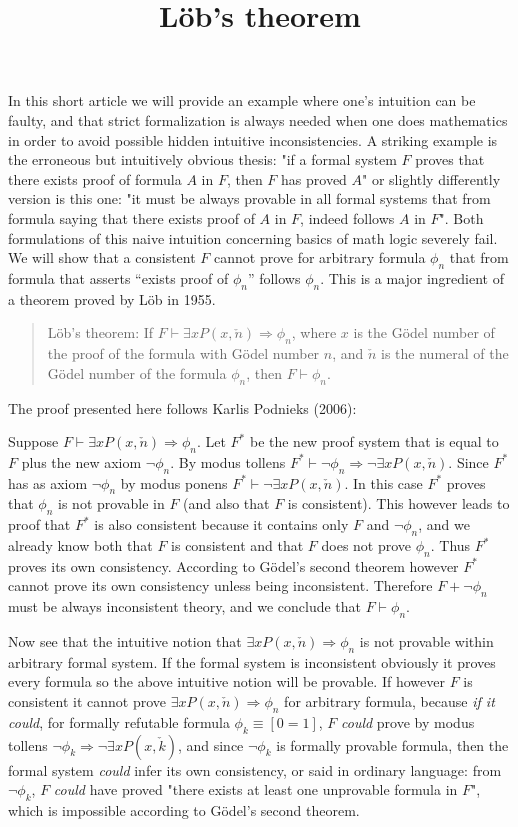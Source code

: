 \documentclass[12pt]{article}
\begin{document}
\title{L\"ob's theorem}

In this short article we will provide an example where one's intuition can be faulty, and that strict formalization is always needed when one does mathematics in order to avoid possible hidden intuitive inconsistencies. A striking example is the erroneous but intuitively obvious thesis: "if a formal system $F$ proves that there exists proof of formula $A$ in $F$, then $F$ has proved $A$" or slightly differently version is this one: "it must be always provable in all formal systems that from formula saying that there exists proof of $A$ in $F$, indeed follows $A$ in $F$". 
Both formulations of this naive intuition concerning basics of math logic severely fail. We will show that a consistent $F$ cannot prove for arbitrary formula $\phi_{n}$ that from formula that asserts {}``exists proof
of $\phi_{n}$'' follows $\phi_{n}$. This is a major ingredient of a theorem proved by L\"ob in 1955.

\begin{verse}
L\"ob's theorem: If $F\vdash\exists xP(x,\check{n})\Rightarrow\phi_{n}$, where $x$ is the G\"odel number of the proof of the formula with G\"odel number $n$, and $\check{n}$ is the numeral of the G\"odel number of
the formula $\phi_{n}$, then $F\vdash\phi_{n}$.
\end{verse}

The proof presented here follows Karlis Podnieks (2006): 

Suppose $F\vdash\exists xP(x,\check{n})\Rightarrow\phi_{n}$.
Let $F^{*}$ be the new proof system that is equal to $F$ plus the new axiom $\neg\phi_{n}$. By modus tollens $F^{*}\vdash\neg\phi_{n}\Rightarrow\neg\exists xP(x,\check{n})$. 
Since $F^{*}$ has as axiom $\neg\phi_{n}$ by modus ponens $F^{*}\vdash\neg\exists xP(x,\check{n})$.
In this case $F^{*}$ proves that $\phi_{n}$ is not provable in $F$ (and also that $F$ is consistent).
This however leads to proof that $F^{*}$ is also consistent because it contains only $F$ and $\neg\phi_{n}$, and we already know both that $F$ is consistent and that $F$ does not prove $\phi_{n}$. Thus $F^{*}$ proves its own consistency. According to G\"odel's second theorem however $F^{*}$ cannot prove
its own consistency unless being inconsistent. Therefore $F+\neg\phi_{n}$
must be always inconsistent theory, and we conclude that $F\vdash\phi_{n}$. 

Now see that the intuitive notion that $\exists xP(x,\check{n})\Rightarrow\phi_{n}$ is not provable within arbitrary formal system. If the formal system is inconsistent obviously it proves every formula so the above intuitive
notion will be provable. If however $F$ is consistent it cannot prove $\exists xP(x,\check{n})\Rightarrow\phi_{n}$ for arbitrary formula, because \emph{if it could}, for formally refutable formula $\phi_{k}\equiv[0=1]$, $F$ \emph{could} prove by modus tollens $\neg\phi_{k}\Rightarrow\neg\exists xP(x,\check{k})$, and since $\neg\phi_{k}$ is formally provable formula, then the formal system \emph{could} infer its own consistency, or said in ordinary language: from $\neg\phi_{k}$, $F$ \emph{could} have proved "there exists at least one unprovable formula in $F$", which is impossible according to G\"odel's second theorem.
\end{document}
